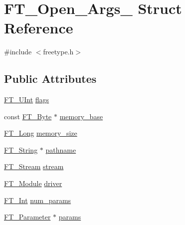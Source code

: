 \hypertarget{struct_f_t___open___args__}{}\section{F\+T\+\_\+\+Open\+\_\+\+Args\+\_\+ Struct Reference}
\label{struct_f_t___open___args__}


{\ttfamily \#include $<$freetype.\+h$>$}

\subsection*{Public Attributes}
\begin{DoxyCompactItemize}
\item 
\mbox{\hyperlink{fttypes_8h_abcb8db4dbf35d2b55a9e8c7b0926dc52}{F\+T\+\_\+\+U\+Int}} \mbox{\hyperlink{struct_f_t___open___args___a2e3e6b9284fe8b4d9833e247a19181fa}{flags}}
\item 
const \mbox{\hyperlink{fttypes_8h_a51f26183ca0c9f4af958939648caeccd}{F\+T\+\_\+\+Byte}} $\ast$ \mbox{\hyperlink{struct_f_t___open___args___a1231da51bc58922096b3bc603bb2ffb0}{memory\+\_\+base}}
\item 
\mbox{\hyperlink{fttypes_8h_a7fa72a1f0e79fb1860c5965789024d6f}{F\+T\+\_\+\+Long}} \mbox{\hyperlink{struct_f_t___open___args___a87f0bb2f257abe94c93a79e0de3525da}{memory\+\_\+size}}
\item 
\mbox{\hyperlink{fttypes_8h_a9846214585359eb2ba6bbb0e6de30639}{F\+T\+\_\+\+String}} $\ast$ \mbox{\hyperlink{struct_f_t___open___args___aea3d454d9fd9bb7434aad07e651d027b}{pathname}}
\item 
\mbox{\hyperlink{ftsystem_8h_a788b32c932932f7411a8dfa7f6c794bf}{F\+T\+\_\+\+Stream}} \mbox{\hyperlink{struct_f_t___open___args___ae1e6444bf0c21b323ce6cbe8bc475b2b}{stream}}
\item 
\mbox{\hyperlink{freetype_8h_a660c1bb333747abacdc433b7d73ca59b}{F\+T\+\_\+\+Module}} \mbox{\hyperlink{struct_f_t___open___args___a7c01bd7e34a440c3e89141ee521e2646}{driver}}
\item 
\mbox{\hyperlink{fttypes_8h_af90e5fb0d07e21be9fe6faa33f02484c}{F\+T\+\_\+\+Int}} \mbox{\hyperlink{struct_f_t___open___args___afaf47d9e1631f2147b696fd7f5a6f4eb}{num\+\_\+params}}
\item 
\mbox{\hyperlink{freetype_8h_a0b96ed5cf9b897c90409981c43633d55}{F\+T\+\_\+\+Parameter}} $\ast$ \mbox{\hyperlink{struct_f_t___open___args___a77b279a34beba29bc14901926f79818f}{params}}
\end{DoxyCompactItemize}


